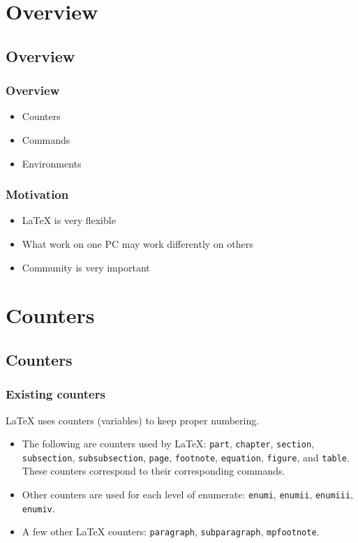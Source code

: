 \section[Overview]{Overview}
\subsection[Overview]{Overview}

\begin{frame}  \frametitle{Overview}
	\begin{itemize}
		\item Counters
		\item Commands
		\item Environments
	\end{itemize}
\end{frame}

\begin{frame}  \frametitle{Motivation}
	\begin{itemize}
		\item LaTeX is very flexible
		\item What work on one PC may work differently on others
		\item Community is very important
	\end{itemize}
\end{frame}


\section[Counters]{Counters}
\subsection[Counters]{Counters}

\begin{frame}  \frametitle{Existing counters}
	LaTeX uses counters (variables) to keep proper numbering. 
	\begin{itemize}
		\item The following are counters used by LaTeX: \texttt{\color{highlight}part}, \texttt{\color{highlight}chapter}, \texttt{\color{highlight}section}, \texttt{\color{highlight}subsection}, \texttt{\color{highlight}subsubsection}, \texttt{\color{highlight}page}, \texttt{\color{highlight}footnote}, \texttt{\color{highlight}equation}, \texttt{\color{highlight}figure}, and \texttt{\color{highlight}table}. These counters correspond to their corresponding commands.
		\item Other counters are used for each level of enumerate: \texttt{\color{highlight}enumi}, \texttt{\color{highlight}enumii}, \texttt{\color{highlight}enumiii}, \texttt{\color{highlight}enumiv}.
		\item A few other LaTeX counters: \texttt{\color{highlight}paragraph}, \texttt{\color{highlight}subparagraph}, \texttt{\color{highlight}mpfootnote}.
	\end{itemize}
\end{frame}


